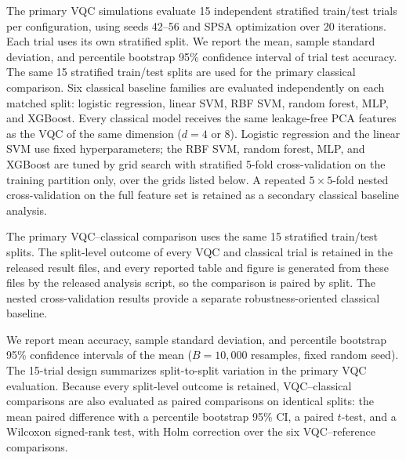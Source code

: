 \documentclass[final,5p,times,number]{elsarticle}
\begin{document}
The primary VQC simulations evaluate 15 independent stratified train/test
trials per configuration, using seeds 42--56 and SPSA optimization over
20 iterations. Each trial uses its own stratified split. We report the
mean, sample standard deviation, and percentile bootstrap 95\%
confidence interval of trial test accuracy. The same 15 stratified
train/test splits are used for the primary classical comparison. Six
classical baseline families are evaluated independently on each matched
split: logistic regression, linear SVM, RBF SVM, random forest, MLP, and
XGBoost. Every classical model receives the same leakage-free PCA features as the VQC of the same dimension ($d=4$ or $8$). Logistic regression and the linear SVM use fixed hyperparameters; the RBF SVM, random forest, MLP, and XGBoost are tuned by grid search with stratified 5-fold cross-validation on the training partition only, over the grids listed below. A repeated $5\times5$-fold nested cross-validation on the full feature set is retained as a secondary classical baseline analysis.

The primary VQC--classical comparison uses the same 15 stratified
train/test splits. The split-level outcome of every VQC and classical
trial is retained in the released result files, and every reported
table and figure is generated from these files by the released analysis
script, so the comparison is paired by split. The nested cross-validation
results provide a separate robustness-oriented classical baseline.

We report mean accuracy, sample standard deviation, and percentile
bootstrap 95\% confidence intervals of the mean ($B=10{,}000$ resamples,
fixed random seed). The 15-trial design summarizes
split-to-split variation in the primary VQC evaluation. Because every
split-level outcome is retained, VQC--classical comparisons are also
evaluated as paired comparisons on identical splits: the mean paired
difference with a percentile bootstrap 95\% CI, a paired $t$-test, and a
Wilcoxon signed-rank test, with Holm correction over the six
VQC--reference comparisons.
\end{document}
